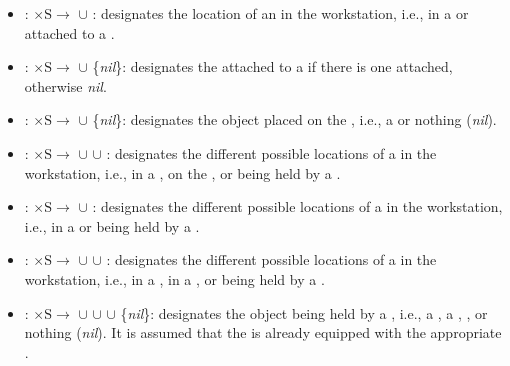 \begin{itemize}
\item {}: $\mathrm{\times S\rightarrow}$ $\cup$ : designates the location of an  in the workstation, i.e., in a  or attached to a .

\item {}: $\mathrm{\times S\rightarrow}$ $\cup$ \{\textit{nil}\}: designates the  attached to a  if there is one attached, otherwise \textit{nil}.

\item {}: $\mathrm{\times S\rightarrow}$ $\cup$ \{\textit{nil}\}: designates the object placed on the , i.e., a  or nothing (\textit{nil}).

\item {}: $\mathrm{\times S\rightarrow}$ $\cup$  $\cup$ : designates the different possible locations of a  in the workstation, i.e., in a , on the , or being held by a .

\item {}: $\mathrm{\times S\rightarrow}$ $\cup$ : designates the different possible locations of a  in the workstation, i.e., in a  or being held by a .

\item {}: $\mathrm{\times S\rightarrow}$ $\cup$  $\cup$ : designates the different possible locations of a  in the workstation, i.e., in a , in a , or being held by a .

\item {}: $\mathrm{\times S\rightarrow}$ $\cup$  $\cup$  $\cup$ \{\textit{nil}\}: designates the object being held by a , i.e., a , a , , or nothing (\textit{nil}). It is assumed that the  is already equipped with the appropriate .


\end{itemize}
